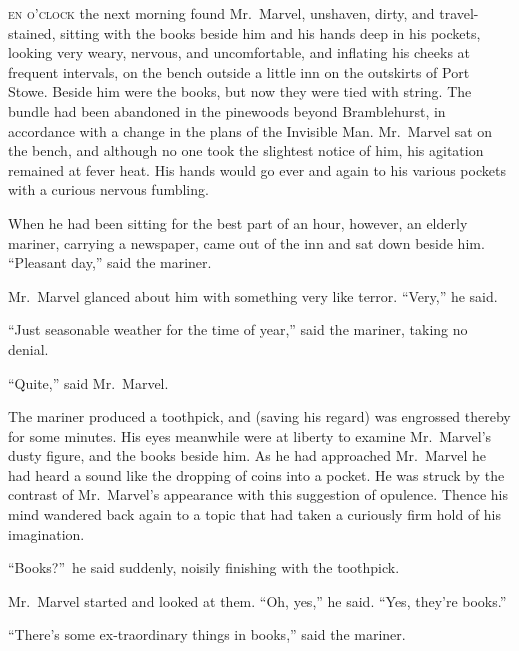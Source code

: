 \label{ch:14}
\begin{ChapterStart}
\vspace*{2\nbs}

\vspace{1.5\nbs}
\end{ChapterStart}

\kern-3pt\textsc{en o’clock} the next morning found Mr.\ Marvel, unshaven, dirty, and travel-stained, sitting with the books beside him and his hands deep in his pockets, looking very weary, nervous, and uncomfortable, and inflating his cheeks at frequent intervals, on the bench outside a little inn on the outskirts of Port Stowe. Beside him were the books, but now they were tied with string. The bundle had been abandoned in the pinewoods beyond Bramblehurst, in accordance with a change in the plans of the Invisible Man. Mr.\ Marvel sat on the bench, and although no one took the slightest notice of him, his agitation remained at fever heat. His hands would go ever and again to his various pockets with a curious nervous fumbling.

When he had been sitting for the best part of an hour, however, an elderly mariner, carrying a newspaper, came out of the inn and sat down beside him. “Pleasant day,” said the mariner.

Mr.\ Marvel glanced about him with something very like terror. “Very,” he said.

“Just seasonable weather for the time of year,” said the mariner, taking no denial.

“Quite,” said Mr.\ Marvel.

The mariner produced a toothpick, and (saving his regard) was engrossed thereby for some minutes. His eyes meanwhile were at liberty to examine Mr.\ Marvel’s dusty figure, and the books beside him. As he had approached Mr.\ Marvel he had heard a sound like the dropping of coins into a pocket. He was struck by the contrast of Mr.\ Marvel’s appearance with this suggestion of opulence. Thence his mind wandered back again to a topic that had taken a curiously firm hold of his imagination.

“Books?”\ he said suddenly, noisily finishing with the toothpick.

Mr.\ Marvel started and looked at them. “Oh, yes,” he said. “Yes, they’re books.”

“There’s some ex-traordinary things in books,” said the mariner.

